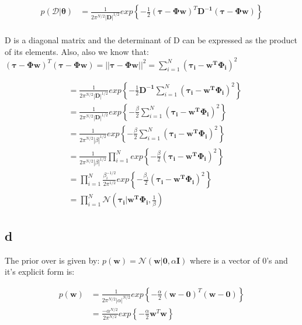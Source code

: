 \documentclass[a4paper]{article}
\begin{document}
\begin{align*}
    p(\mathcal{D}|\pmb{\theta}) &= \frac{1}{2\pi^{N/2}|\pmb{D}|^{1/2}}exp\left\{-\frac{1}{2}(\pmb{\tau}-\pmb{\Phi w})^{T}\pmb{D^{-1}}(\pmb{\tau}-\pmb{\Phi w})  \right\} \\
\end{align*}{}

D is a diagonal matrix and the determinant of D can be expressed as the product of its elements. Also, also we know that:
$
    (\pmb{\tau}-\pmb{\Phi w})^{T}(\pmb{\tau}-\pmb{\Phi w}) = 
    || \pmb{\tau - \Phi w}||^{2}  = \sum_{i=1}^{N}(\pmb{\tau_i}-\pmb{w^{T} \Phi_i})^{2} 
$

\begin{align*}
    &= \frac{1}{2\pi^{N/2}|\pmb{D}|^{1/2}}exp\left\{-\frac{1}{2}\pmb{D^{-1}}\sum_{i=1}^{N}(\pmb{\tau_i}-\pmb{w^{T} \Phi_i})^{2} \right\} \\
    &= \frac{1}{2\pi^{N/2}|\pmb{D}|^{1/2}}exp\left\{-\frac{\beta}{2}\sum_{i=1}^{N}(\pmb{\tau_i}-\pmb{w^{T} \Phi_i})^{2}  \right\} \\
    &= \frac{1}{2\pi^{N/2}|\beta|^{1/2}}exp\left\{-\frac{\beta}{2}\sum_{i=1}^{N}(\pmb{\tau_i}-\pmb{w^{T} \Phi_i})^{2}  \right\} \\
    &= \frac{1}{2\pi^{N/2}|\beta|^{1/2}}\prod_{i=1}^{N}exp\left\{-\frac{\beta}{2}(\pmb{\tau_i}-\pmb{w^{T} \Phi_i})^{2}  \right\} \\
    &= \prod_{i=1}^{N}\frac{\beta_i^{-1/2}}{2\pi^{1/2}}exp\left\{-\frac{\beta_i}{2}(\pmb{\tau_i}-\pmb{w^{T} \Phi_i})^{2}  \right\} \\
    &= \prod_{i=1}^{N} \mathcal{N}\left(\pmb{\tau_i}|\pmb{w^T\Phi_i}, \frac{1}{\beta}\right)
\end{align*}{}

\subsection*{d}
The prior over  is given by: $p(\pmb{w}) = \mathcal{N}(\pmb{w}|\pmb{0}, \alpha \pmb{I})$ where  is a vector of 0's and it's explicit form is:

\begin{align*}
    p(\pmb{w}) &= \frac{1}{2\pi^{N/2}|\alpha|^{N/2}}exp\left\{-\frac{\alpha}{2}(\pmb{w}- \pmb{0})^{T}(\pmb{w}-\pmb{0}) \right\} \\
    &= \frac{-\alpha^{N/2}}{2\pi^{N/2}}exp\left\{-\frac{\alpha}{2}\pmb{w}^{T}\pmb{w} \right\} \\
\end{align*}{}
\end{document}

